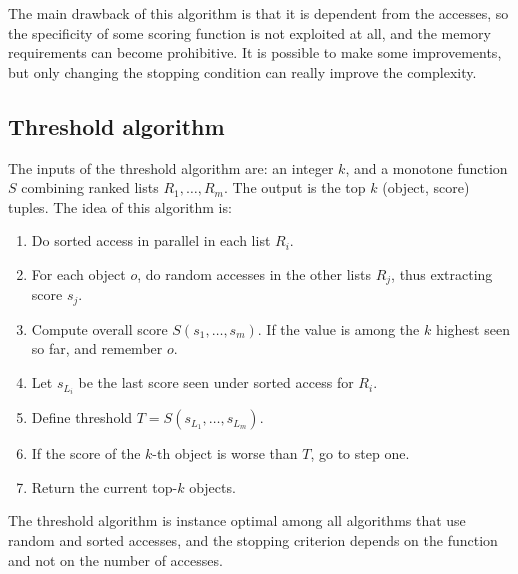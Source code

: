 \documentclass[12pt, a4paper]{report}
\newtheorem[style=M,bodystyle=\normalfont]{theorem}{Theorem}
\newtheorem[style=M,bodystyle=\normalfont]{corollary}{Corollary}
\newtheorem[style=M,bodystyle=\normalfont]{lemma}{Lemma}
\newtheorem[style=M,bodystyle=\normalfont]{definition}{Definition}
\begin{document}
    The main drawback of this algorithm is that it is dependent from the accesses, so the specificity of some scoring function is not exploited
    at all, and the memory requirements can become prohibitive. It is possible to make 
    some improvements, but only changing the stopping condition can really improve the complexity. 

    \subsection{Threshold algorithm}
    The inputs of the threshold algorithm are: an integer $k$, and a monotone function $S$ combining ranked lists $R_1,\dots,R_m$. 
    The output is the top $k$ (object, score) tuples. The idea of this algorithm is: 
    \begin{enumerate}
        \item Do sorted access in parallel in each list $R_i$. 
        \item For each object $o$, do random accesses in the other lists $R_j$, thus extracting score $s_j$. 
        \item Compute overall score $S(s_1, \dots, s_m)$. If the value is among the $k$ highest seen so far, and remember $o$. 
        \item Let $s_{L_i}$ be the last score seen under sorted access for $R_i$. 
        \item Define threshold $T=S(s_{L_1}, \dots, s_{L_m})$. 
        \item If the score of the $k$-th object is worse than $T$, go to step one. 
        \item Return the current top-$k$ objects. 
    \end{enumerate}
    The threshold algorithm is instance optimal among all algorithms that use random and sorted accesses, and the stopping criterion depends 
    on the function and not on the number of accesses. 
\end{document}
